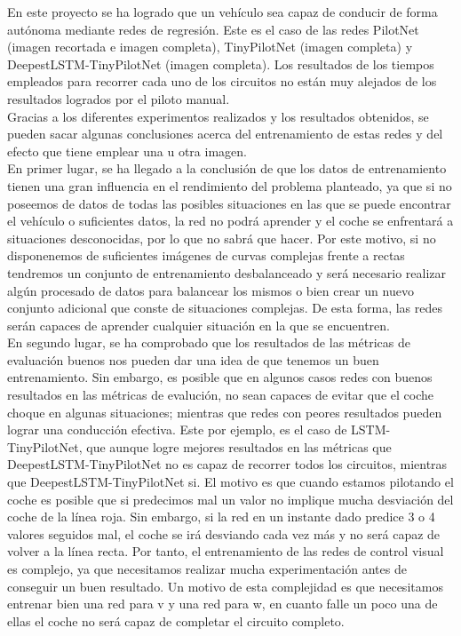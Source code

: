 En este proyecto se ha logrado que un vehículo sea capaz de conducir de forma autónoma mediante redes de regresión. Este es el caso de las redes PilotNet (imagen recortada e imagen completa), TinyPilotNet (imagen completa) y DeepestLSTM-TinyPilotNet (imagen completa). Los resultados de los tiempos empleados para recorrer cada uno de los circuitos no están muy alejados de los resultados logrados por el piloto manual.\\

Gracias a los diferentes experimentos realizados y los resultados obtenidos, se pueden sacar algunas conclusiones acerca del entrenamiento de estas redes y del efecto que tiene emplear una u otra imagen.\\

En primer lugar, se ha llegado a la conclusión de que los datos de entrenamiento tienen una gran influencia en el rendimiento del problema planteado, ya que si no poseemos de datos de todas las posibles situaciones en las que se puede encontrar el vehículo o suficientes datos, la red no podrá aprender y el coche se enfrentará a situaciones desconocidas, por lo que no sabrá que hacer. Por este motivo, si no disponenemos de suficientes imágenes de curvas complejas frente a rectas tendremos un conjunto de entrenamiento desbalanceado y será necesario realizar algún procesado de datos para balancear los mismos o bien crear un nuevo conjunto adicional que conste de situaciones complejas. De esta forma, las redes serán capaces de aprender cualquier situación en la que se encuentren.\\

En segundo lugar, se ha comprobado que los resultados de las métricas de evaluación buenos nos pueden dar una idea de que tenemos un buen entrenamiento. Sin embargo, es posible que en algunos casos redes con buenos resultados en las métricas de evalución, no sean capaces de evitar que el coche choque en algunas situaciones; mientras que redes con peores resultados pueden lograr una conducción efectiva. Este por ejemplo, es el caso de LSTM-TinyPilotNet, que aunque logre mejores resultados en las métricas que DeepestLSTM-TinyPilotNet no es capaz de recorrer todos los circuitos, mientras que DeepestLSTM-TinyPilotNet si. El motivo es que cuando estamos pilotando el coche es posible que si predecimos mal un valor no implique mucha desviación del coche de la línea roja. Sin embargo, si la red en un instante dado predice 3 o 4 valores seguidos mal, el coche se irá desviando cada vez más y no será capaz de volver a la línea recta. Por tanto, el entrenamiento de las redes de control visual es complejo, ya que necesitamos realizar mucha experimentación antes de conseguir un buen resultado. Un motivo de esta complejidad es que necesitamos entrenar bien una red para v y una red para w, en cuanto falle un poco una de ellas el coche no será capaz de completar el circuito completo.\\

